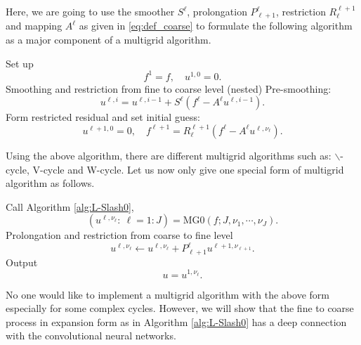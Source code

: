 Here, we are going to use the smoother $S^\ell$, prolongation $P^{\ell}_{\ell+1}$, restriction $R_{\ell}^{\ell+1}$ and mapping
$A^\ell$ as given in \eqref{eq:def_coarse}  to formulate the following algorithm
as a major component of a multigrid algorithm. 
\begin{breakablealgorithm}%
	\caption{$(u^{\ell,\nu_\ell}: ~\ell = 1:J) = {\text{MG0}}(f; J,\nu_1, \cdots, \nu_J)$}
	\label{alg:L-Slash0}
	\begin{algorithmic}
		\State Set up
		$$
		f^1 = f, \quad u^{1,0}=0.
		$$
		\State Smoothing and restriction from fine to coarse level (nested)
		\State Pre-smoothing:
		\State
		\begin{equation}\label{eq:smoothing}
		u^{\ell,i} = u^{\ell,i-1} + S^{\ell} (f^\ell - A^\ell u^{\ell,i-1}).
		\end{equation}
		\EndFor
		\State Form restricted residual and set initial guess:
		$$
		u^{\ell+1,0} = 0, \quad f^{\ell+1} = R^{\ell+1}_\ell(f^\ell - A^{\ell} u^{\ell,\nu_\ell}).
		$$
		\EndFor
	\end{algorithmic}
\end{breakablealgorithm}

Using the above algorithm, there are different multigrid algorithms such as: $\backslash$-cycle, V-cycle and W-cycle.
Let us now only give one special form of multigrid algorithm as follows.
\begin{breakablealgorithm}%
	\caption{$u = {\backslash\text{-MG}}(f; J,\nu_1, \cdots, \nu_J)$}
	\label{alg:L-Slash1}
	\begin{algorithmic}
		\State Call Algorithm \ref{alg:L-Slash0},
		$$
		(u^{\ell,\nu_\ell}: ~\ell = 1:J) = {\text{MG0}}(f; J,\nu_1, \cdots, \nu_J).
		$$
		\State Prolongation and restriction from coarse to fine level
		\For{$\ell = J-1:1$}
		\State
		$$
		u^{\ell,\nu_\ell} \leftarrow u^{\ell,\nu_\ell} + P_{\ell+1}^{\ell}u^{\ell+1, \nu_{\ell+1}}.
		$$
		\EndFor
		\State Output
		$$
		u = u^{1,\nu_\ell}.
		$$
	\end{algorithmic}
\end{breakablealgorithm}

No one would like to implement a multigrid algorithm with the above form
especially for some complex cycles. However, we will show that the fine to 
coarse process in expansion form as in Algorithm \ref{alg:L-Slash0} has a deep
connection with the convolutional neural networks. 
